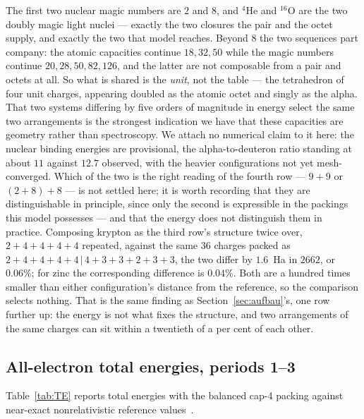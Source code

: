 \documentclass[11pt]{article}
\begin{document}
The first two nuclear magic numbers are $2$ and $8$, and $^4$He and $^{16}$O are the two doubly
magic light nuclei --- exactly the two closures the pair and the octet supply, and exactly the two
that model reaches. Beyond $8$ the two sequences part company: the atomic capacities continue
$18,32,50$ while the magic numbers continue $20,28,50,82,126$, and the latter are not
composable from a pair and octets at all. So what is shared is the \emph{unit}, not the table
--- the tetrahedron of four unit charges, appearing doubled as the atomic octet and singly as
the alpha. That two systems differing by five orders of magnitude in energy select the same two
arrangements is the strongest indication we have that these capacities are geometry rather than
spectroscopy. We attach no numerical claim to it here: the nuclear binding energies are
provisional, the alpha-to-deuteron ratio standing at about $11$ against $12.7$ observed, with
the heavier configurations not yet mesh-converged. Which of the two is the right
reading of the fourth row --- $9{+}9$ or $(2{+}8){+}8$ --- is not settled here; it is worth
recording that they are distinguishable in principle, since only the second is expressible in
the packings this model possesses --- and that the energy does not distinguish them in practice.
Composing krypton as the third row's structure twice over, $2{+}4{+}4{+}4{+}4$ repeated, against
the same $36$ charges packed as $2{+}4{+}4{+}4{+}4\,|\,4{+}3{+}3{+}2{+}3{+}3$, the two differ by
$1.6$~Ha in $2662$, or $0.06\%$; for zinc the corresponding difference is $0.04\%$. Both are a
hundred times smaller than either configuration's distance from the reference, so the comparison
selects nothing. That is the same finding as Section~\ref{sec:aufbau}'s, one row further up: the
energy is not what fixes the structure, and two arrangements of the same charges can sit within
a twentieth of a per cent of each other.

\subsection{All-electron total energies, periods 1--3}\label{sec:TEexplicit}

Table~\ref{tab:TE} reports total energies with the balanced cap-4 packing against
near-exact nonrelativistic reference values~\cite{Chakravorty}.
\end{document}
